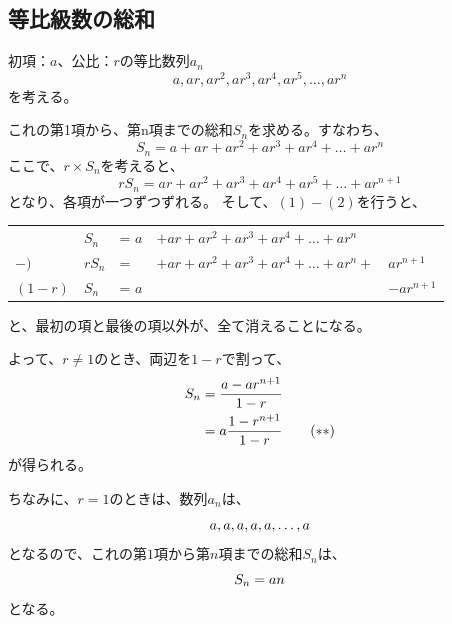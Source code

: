\documentclass[12pt,a4paper,fleqn]{ltjsarticle}
\begin{document}
\subsection{等比級数の総和}
初項：$a$、公比：$r$の等比数列$a_n$
\begin{displaymath}
  a,ar,ar^2,ar^3,ar^4,ar^5,\dots,ar^n
\end{displaymath}
を考える。

これの第1項から、第n項までの総和$S_n$を求める。すなわち、
\begin{equation}
  S_n = a + ar + ar^2 + ar^3 + ar^4 + \dots + ar^n \tag{1}
\end{equation}
ここで、$r \times S_n$を考えると、
\begin{equation}
  rS_n = ar + ar^2 + ar^3 + ar^4 + ar^5 + \dots + ar^{n+1} \tag{2}
\end{equation}
となり、各項が一つずつずれる。
そして、$(1) - (2)$を行うと、

\begin{tabular}{lllll}
           &$S_n$   &= $a$ &$+ ar + ar^2 + ar^3 + ar^4 + \dots + ar^n$ &\\
       $-)$&$rS_n$  &=     &$+ ar + ar^2 + ar^3 + ar^4 + \dots + ar^n +$ &$ar^{n+1}$ \\ \hline
    $(1-r)$&$S_n$   &= $a$ &                                             &$ - ar^{n+1}$
\end{tabular}

と、最初の項と最後の項以外が、全て消えることになる。

よって、$r \neq 1$のとき、両辺を$1 - r$で割って、
\begin{align}
  S_n &= \frac{a - ar^{n+1}}{1-r} \notag \\
      &= a\frac{1-r^{n+1}}{1-r} \tag{$**$}
\end{align}
が得られる。\par

ちなみに、$r = 1$のときは、数列$a_n$は、
\begin{equation}
  a, a, a, a, a, \dots ,a \notag
\end{equation}
となるので、これの第$1$項から第$n$項までの総和$S_n$は、
\begin{equation}
  S_n = an \notag
\end{equation}
となる。
\end{document}
